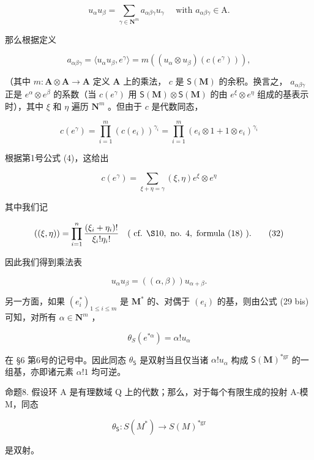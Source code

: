 \[
u _ {\alpha} u _ {\beta} = \sum_ {\gamma \in \mathbf {N} ^ {m}} a _ {\alpha \beta \gamma} u _ {\gamma} \quad \text { with } a _ {\alpha \beta \gamma} \in \mathrm{A}.
\]

那么根据定义

\[
a _ {\alpha \beta \gamma} = \langle u _ {\alpha} u _ {\beta}, e ^ {\gamma} \rangle = m ((u _ {\alpha} \otimes u _ {\beta}) (c (e ^ {\gamma}))),
\]

（其中 \(m: \mathbf{A} \otimes \mathbf{A} \to \mathbf{A}\) 定义 \(\mathbf{A}\) 上的乘法， \(c\) 是 \(\mathsf{S}(\mathbf{M})\) 的余积。换言之， \(a_{\alpha \beta \gamma}\) 正是 \(e^{\alpha} \otimes e^{\beta}\) 的系数（当 \(c(e^{\gamma})\) 用 \(\mathsf{S}(\mathbf{M})\otimes \mathsf{S}(\mathbf{M})\) 的由 \(e^{\xi}\otimes e^{\eta}\) 组成的基表示时），其中 \(\xi\) 和 \(\eta\) 遍历 \(\mathbf{N}^m\) 。但由于 \(c\) 是代数同态，

\[
c (e ^ {\gamma}) = \prod_ {i = 1} ^ {m} (c (e _ {i})) ^ {\gamma_ {i}} = \prod_ {i = 1} ^ {m} (e _ {i} \otimes 1 + 1 \otimes e _ {i}) ^ {\gamma_ {i}}
\]

根据第1号公式 (4)，这给出

\[
c (e ^ {\gamma}) = \sum_ {\xi + \eta = \gamma} (\xi , \eta) e ^ {\xi} \otimes e ^ {\eta}\tag{31}
\]

其中我们记

\[
((\xi , \eta)) = \prod_ {i = 1} ^ {n} \frac {(\xi_ {i} + \eta_ {i}) !}{\xi_ {i} ! \eta_ {i} !} \quad (\text { cf.   } \S 10, \text {   no.   } 4, \text {   formula   (18) }).\tag{32}
\]

因此我们得到乘法表

\[
u _ {\alpha} u _ {\beta} = ((\alpha , \beta)) u _ {\alpha + \beta}.\tag{33}
\]

另一方面，如果 \((e_i^*)_{1\leq i\leq m}\) 是 \(\mathbf{M}^*\) 的、对偶于 \((e_i)\) 的基，则由公式 (29 bis) 可知，对所有 \(\alpha \in \mathbf{N}^m\) ，

\[
\theta_ {S} (e ^ {* \alpha}) = \alpha ! u _ {\alpha}\tag{34}
\]

在 §6 第6号的记号中。因此同态 \(\theta_{\mathsf{S}}\) 是双射当且仅当诸 \(\alpha!u_{\alpha}\) 构成 \(\mathsf{S}(\mathbf{M})^{*\mathrm{gr}}\) 的一组基，亦即诸元素 \(\alpha!1\) 均可逆。

命题8. 假设环 A 是有理数域 Q 上的代数；那么，对于每个有限生成的投射 A-模 M，同态

\[
\theta_ {\mathsf {S}}: S (M ^ {*}) \rightarrow S (M) ^ {* \mathrm{gr}}
\]

是双射。


